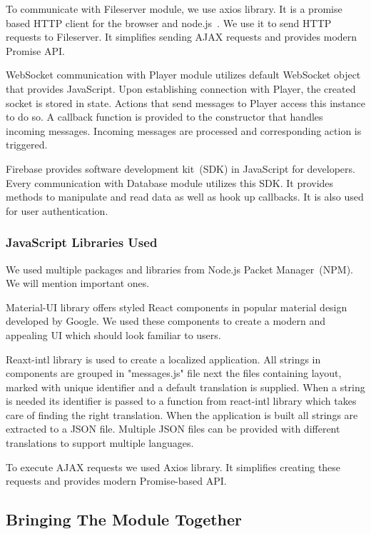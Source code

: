 To communicate with Fileserver module, we use axios library. It is a promise based HTTP client for the browser and node.js~\citep{axios}. We use it to send HTTP requests to Fileserver. It simplifies sending AJAX requests and provides modern Promise API. 
\par
WebSocket communication with Player module utilizes default WebSocket object that provides JavaScript. Upon establishing connection with Player, the created socket is stored in state. Actions that send messages to Player access this instance to do so. A callback function is provided to the constructor that handles incoming messages. Incoming messages are processed and corresponding action is triggered.
\par
Firebase provides software development kit~(SDK) in JavaScript for developers. Every communication with Database module utilizes this SDK. It provides methods to manipulate and read data as well as hook up callbacks. It is also used for user authentication.

\subsubsection{JavaScript Libraries Used}

We used multiple packages and libraries from Node.js Packet Manager~(NPM). We will mention important ones.
\par
Material-UI library offers styled React components in popular material design developed by Google. We used these components to create a modern and appealing UI which should look familiar to users.
\par
Reaxt-intl library is used to create a localized application. All strings in components are grouped in "messages.js" file next the files containing layout, marked with unique identifier and a default translation is supplied. When a string is needed its identifier is passed to a function from react-intl library which takes care of finding the right translation. When the application is built all strings are extracted to a JSON file. Multiple JSON files can be provided with different translations to support multiple languages.
\par
To execute AJAX requests we used Axios library. It simplifies creating these requests and provides modern Promise-based API.


\subsection{Bringing The Module Together}

